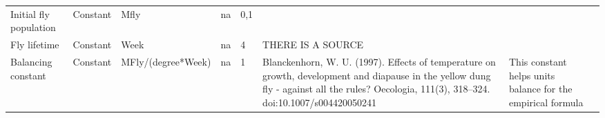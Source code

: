 \begin{landscape}
\begin{longtable}[c]{m{10em}lllm{15em}lll}
Initial fly population                        & Constant & Mfly                     & na                        & 0,1                                                                                                                                                                                                                                                                                      &                                                                                                                                                                                              &                                                                                                                                                                                                                                       \\
Fly lifetime                                  & Constant & Week                     & na                        & 4                                                                                                                                                                                                                                                                                        & THERE IS A SOURCE                                                                                                                                                                            &                                                                                                                                                                                                                                       \\
Balancing constant                            & Constant & MFly/(degree*Week)       & na                        & 1                                                                                                                                                                                                                                                                                        & Blanckenhorn, W. U. (1997). Effects of temperature on growth, development and diapause in the yellow dung fly - against all the rules? Oecologia, 111(3), 318–324. doi:10.1007/s004420050241 & This constant helps units balance for the empirical formula                                                                                                                                                                           \\

\end{longtable}
\end{landscape}
